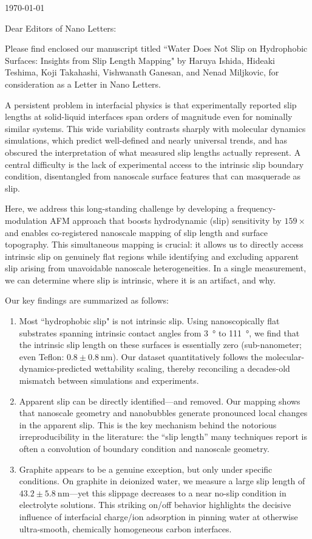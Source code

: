 \documentclass[12pt]{article}
\begin{document}
\today

Dear Editors of Nano Letters:

Please find enclosed our manuscript titled ``Water Does Not Slip on Hydrophobic Surfaces: Insights from Slip Length Mapping" by Haruya Ishida, Hideaki Teshima, Koji Takahashi, Vishwanath Ganesan, and Nenad Miljkovic, for consideration as a Letter in Nano Letters.

A persistent problem in interfacial physics is that experimentally reported slip lengths at solid-liquid interfaces span orders of magnitude even for nominally similar systems. This wide variability contrasts sharply with molecular dynamics simulations, which predict well-defined and nearly universal trends, and has obscured the interpretation of what measured slip lengths actually represent. A central difficulty is the lack of experimental access to the intrinsic slip boundary condition, disentangled from nanoscale surface features that can masquerade as slip.

Here, we address this long-standing challenge by developing a frequency-modulation AFM approach that boosts hydrodynamic (slip) sensitivity by $159\times$ and enables co-registered nanoscale mapping of slip length and surface topography. This simultaneous mapping is crucial: it allows us to directly access intrinsic slip on genuinely flat regions while identifying and excluding apparent slip arising from unavoidable nanoscale heterogeneities. In a single measurement, we can determine where slip is intrinsic, where it is an artifact, and why.

Our key findings are summarized as follows:
\begin{enumerate}
\item Most ``hydrophobic slip" is not intrinsic slip. Using nanoscopically flat substrates spanning intrinsic contact angles from \SI{3}{\degree} to \SI{111}{\degree}, we find that the intrinsic slip length on these surfaces is essentially zero (sub-nanometer; even Teflon: $0.8 \pm  \SI{0.8}{\nano\metre}$). Our dataset quantitatively follows the molecular-dynamics-predicted wettability scaling, thereby reconciling a decades-old mismatch between simulations and experiments.

\item Apparent slip can be directly identified—and removed. Our mapping shows that nanoscale geometry and nanobubbles generate pronounced local changes in the apparent slip. This is the key mechanism behind the notorious irreproducibility in the literature: the “slip length” many techniques report is often a convolution of boundary condition and nanoscale geometry.

\item Graphite appears to be a genuine exception, but only under specific conditions. On graphite in deionized water, we measure a large slip length of $43.2 \pm \SI{5.8}{\nano\metre}$—yet this slippage decreases to a near no-slip condition in electrolyte solutions. This striking on/off behavior highlights the decisive influence of interfacial charge/ion adsorption in pinning water at otherwise ultra-smooth, chemically homogeneous carbon interfaces.
\end{enumerate}
\end{document}
